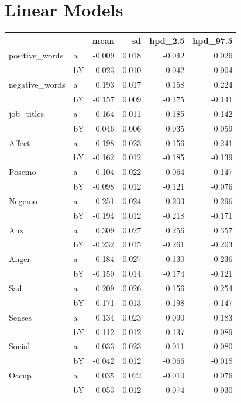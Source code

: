 \documentclass[11pt,a4paper]{article}
\begin{document}
\section{Linear Models}
\tiny
\begin{longtable}{llrrrr}
\toprule
      &    &   mean &     sd &  hpd\_2.5 &  hpd\_97.5 \\
\midrule
positive\_words & a & -0.009 &  0.018 &   -0.042 &     0.026 \\
      & bY & -0.023 &  0.010 &   -0.042 &    -0.004 \\
negative\_words & a &  0.193 &  0.017 &    0.158 &     0.224 \\
      & bY & -0.157 &  0.009 &   -0.175 &    -0.141 \\
job\_titles & a & -0.164 &  0.011 &   -0.185 &    -0.142 \\
      & bY &  0.046 &  0.006 &    0.035 &     0.059 \\
Affect & a &  0.198 &  0.023 &    0.156 &     0.241 \\
      & bY & -0.162 &  0.012 &   -0.185 &    -0.139 \\
Posemo & a &  0.104 &  0.022 &    0.064 &     0.147 \\
      & bY & -0.098 &  0.012 &   -0.121 &    -0.076 \\
Negemo & a &  0.251 &  0.024 &    0.203 &     0.296 \\
      & bY & -0.194 &  0.012 &   -0.218 &    -0.171 \\
Anx & a &  0.309 &  0.027 &    0.256 &     0.357 \\
      & bY & -0.232 &  0.015 &   -0.261 &    -0.203 \\
Anger & a &  0.184 &  0.027 &    0.130 &     0.236 \\
      & bY & -0.150 &  0.014 &   -0.174 &    -0.121 \\
Sad & a &  0.209 &  0.026 &    0.156 &     0.254 \\
      & bY & -0.171 &  0.013 &   -0.198 &    -0.147 \\
Senses & a &  0.134 &  0.023 &    0.090 &     0.183 \\
      & bY & -0.112 &  0.012 &   -0.137 &    -0.089 \\
Social & a &  0.033 &  0.023 &   -0.011 &     0.080 \\
      & bY & -0.042 &  0.012 &   -0.066 &    -0.018 \\
Occup & a &  0.035 &  0.022 &   -0.010 &     0.076 \\
      & bY & -0.053 &  0.012 &   -0.074 &    -0.030 \\

\end{longtable}
\end{document}
